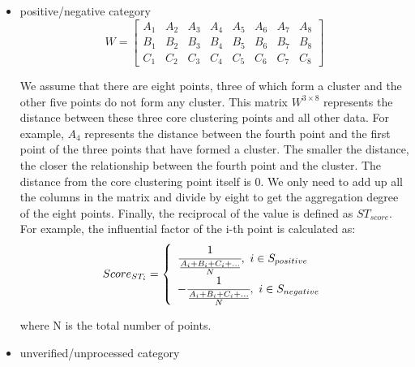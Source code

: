 \documentclass{mcmthesis}
\begin{document}
\begin{itemize}
    \item positive/negative category
    $$
    W =
    \begin{bmatrix}
      A_1&A_2  &A_3  &A_4  &A_5&A_6&A_7&A_8 \\
      B_1&B_2  &B_3  &B_4  &B_5&B_6&B_7&B_8 \\
      C_1&C_2  &C_3  &C_4  &C_5&C_6&C_7&C_8 
    \end{bmatrix}
    $$

    We assume that there are eight points, three of which form a cluster and the other five points do not form any cluster. This matrix $W^{3\times8}$ represents the distance between these three core clustering points and all other data. For example, $A_4$ represents the distance between the fourth point and the first point of the three points that have formed a cluster. The smaller the distance, the closer the relationship between the fourth point and the cluster. The distance from the core clustering point itself is 0. We only need to add up all the columns in the matrix and divide by eight to get the aggregation degree of the eight points. Finally, the reciprocal of the value is defined as $ST_{score}$.
    For example, the influential factor of the i-th point is calculated as:
    \begin{equation}
    Score_{ST_i} = 
    \left\{
        \begin{array}{lr}
            \cfrac{1}{\frac{A_i+B_i+C_i+...}{N}} ,\ i\in S_{positive}\\
            -\cfrac{1}{\frac{A_i+B_i+C_i+...}{N}} ,\ i\in S_{negative}
        \end{array}
    \right.
    \end{equation}
    
    where N is the total number of points.
    \item unverified/unprocessed category
    

\end{itemize}
\end{document}
